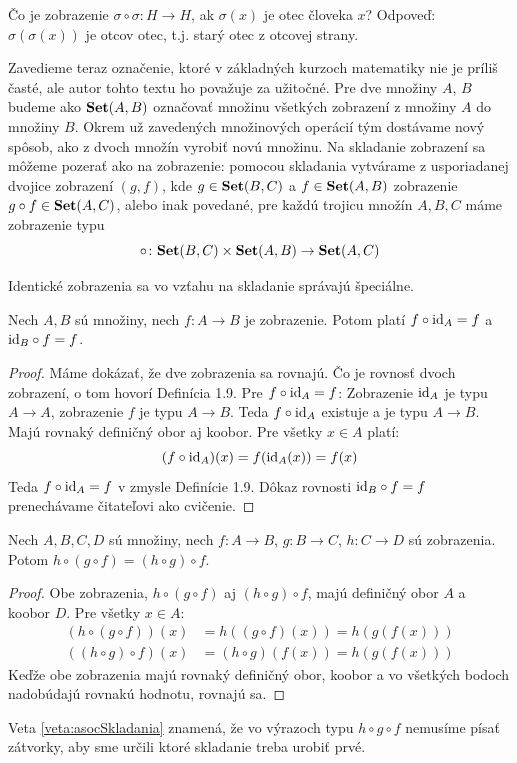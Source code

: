 \begin{example}
Čo je zobrazenie $\sigma \circ \sigma \colon H \rightarrow H$, ak $\sigma(x)$ je otec človeka $x$?
Odpoveď: $\sigma(\sigma(x))$ je otcov otec, t.j. starý otec z otcovej strany.
\end{example}

Zavedieme teraz označenie, ktoré v základných kurzoch matematiky nie je príliš časté, ale autor tohto textu ho považuje za
užitočné. Pre dve množiny $A$, $B$ budeme ako $\mathbf{Set}(A,B)$ označovať množinu všetkých zobrazení
z množiny $A$ do množiny $B$. Okrem už zavedených množinových operácií tým dostávame nový spôsob, ako z dvoch množín
vyrobiť novú množinu. Na skladanie zobrazení sa môžeme pozerať ako na zobrazenie: pomocou skladania
vytvárame z usporiadanej dvojice zobrazení $(g,f)$, kde $g\in\mathbf{Set}(B,C)$ a $f\in\mathbf{Set}(A,B)$ zobrazenie
$g\circ f\in\mathbf{Set}(A,C)$, alebo inak povedané, pre každú trojicu množín $A,B,C$ máme zobrazenie typu
\[
\circ\colon\mathbf{Set}(B,C)\times\mathbf{Set}(A,B)\to\mathbf{Set}(A,C)
\]

Identické zobrazenia sa vo vzťahu na skladanie správajú špeciálne.
\begin{veta}\label{veta:neutralitaId}
Nech $A, B$ sú množiny, nech $f \colon A \rightarrow B$ je zobrazenie.
Potom platí $f \circ \mathrm{id}_A = f$ a $\mathrm{id}_B \circ f = f$.
\end{veta}

\begin{proof}
Máme dokázať, že dve zobrazenia sa rovnajú.
Čo je rovnosť dvoch zobrazení, o tom hovorí Definícia 1.9.
Pre $f \circ \mathrm{id}_A = f$:
Zobrazenie $\mathrm{id}_A$ je typu $A \rightarrow A$, zobrazenie $f$ je typu $A \rightarrow B$.
Teda $f \circ \mathrm{id}_A$ existuje a je typu $A \rightarrow B$. Majú rovnaký definičný obor aj koobor.
Pre všetky $x \in A$ platí:
$$ (f \circ \mathrm{id}_A)(x) = f(\mathrm{id}_A(x)) = f(x) $$
Teda $f \circ \mathrm{id}_A = f$ v zmysle Definície 1.9.
Dôkaz rovnosti $\mathrm{id}_B \circ f = f$ prenechávame čitateľovi ako cvičenie.
\end{proof}

\begin{veta}\label{veta:asocSkladania}
Nech $A, B, C, D$ sú množiny, nech $f \colon A \rightarrow B$, $g \colon B
\rightarrow C$, $h \colon C \rightarrow D$ sú zobrazenia.
Potom $h \circ (g \circ f)
= (h \circ g) \circ f$.
\end{veta}

\begin{proof}
Obe zobrazenia, $h \circ (g \circ f)$ aj $(h \circ g) \circ f$, majú definičný obor $A$ a koobor $D$.
Pre všetky $x \in A$:
\begin{align*}
    (h \circ (g \circ f))(x) &= h((g \circ f)(x)) = h(g(f(x))) \\
    ((h \circ g) \circ f)(x) &= (h \circ g)(f(x)) = h(g(f(x)))
\end{align*}
Keďže obe zobrazenia majú rovnaký definičný obor, koobor a vo všetkých bodoch nadobúdajú rovnakú hodnotu, rovnajú sa.
\end{proof}
Veta \ref{veta:asocSkladania} znamená, že vo výrazoch typu $h\circ g\circ f$ nemusíme písať zátvorky, aby sme
určili ktoré skladanie treba urobiť prvé.
